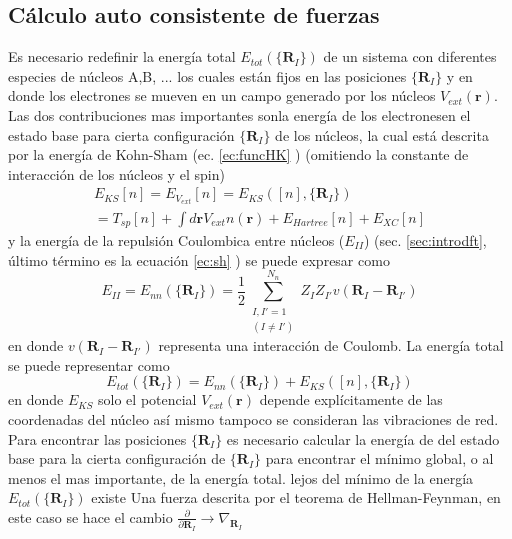 \documentclass[12pt,a4paper, oneside]{book}
\begin{document}
   \subsection{C\'alculo auto consistente de fuerzas} \label{subsec:SConsFuerza}
   Es necesario redefinir la energ\'ia total $E_{tot} (\{\pmb{R}_I\})$ de un sistema con diferentes especies de n\'ucleos A,B, ... los cuales est\'an fijos en las posiciones $\{\pmb{R}_I\} $ y en donde los electrones se mueven en un campo generado por los n\'ucleos $V_{ext} (\pmb{r})$. Las dos contribuciones mas importantes sonla energ\'ia de los electronesen el estado base para cierta configuraci\'on $\{\pmb{R}_I\}$ de los n\'ucleos, la cual est\'a descrita por la energ\'ia de Kohn-Sham (ec. \ref{ec:funcHK} )  (omitiendo la constante de interacci\'on de los n\'ucleos y el spin)
   \begin{multline}
   E_{KS} [n] = E_{V_{ext}} [n] = E_{KS} ([n],\{\pmb{R}_I\}) \\
   = T_{sp} [n] + \int d \pmb{r} V_{ext} n(\pmb{r}) + E_{Hartree} [n] + E_{XC} [n] \label{ec:KS_Fuerza}
   \end{multline}
   y la energ\'ia de la repulsi\'on Coulombica  entre n\'ucleos ($E_{I I}$) (sec. \ref{sec:introdft}, \'ultimo t\'ermino es la ecuaci\'on \ref{ec:sh} ) se puede expresar como
   \begin{equation}
   	E_{II} = E_{nn} (\{\pmb{R}_I\}) = \frac{1}{2} \sum_{\substack{I,I' = 1 \\ (I \not = I')}}^ {N_n} Z_I Z_{I'} v(\pmb{R}_I - \pmb{R}_{I'}) \label{ec:IntII}
   \end{equation}
   en donde $ v(\pmb{R}_I - \pmb{R}_{I'})$ representa una interacci\'on de Coulomb. La energ\'ia total se puede representar como
   \begin{equation}
   E_{tot} (\{\pmb{R}_I\}) = E_{nn} (\{\pmb{R}_I\}) + E_{KS} ([n], \{\pmb{R}_I\}) \label{ec:EnTot2} 
   \end{equation}
   en donde $E_{KS}$ solo el potencial $V_{ext} (\pmb{r})$ depende expl\'icitamente de las coordenadas del n\'ucleo as\'i mismo tampoco se consideran las vibraciones de red.
   \newline
   Para encontrar las posiciones $ \{\pmb{R}_I \}$ es necesario calcular la energ\'ia de del estado base para la cierta configuraci\'on de $ \{\pmb{R}_I \}$ para encontrar el m\'inimo global, o al menos el mas importante,  de la energ\'ia total. lejos del m\'inimo de la energ\'ia $E_{tot} (\{\pmb{R}_I\})$ existe Una fuerza descrita por el teorema de Hellman-Feynman, en este caso se hace el cambio $\frac{\partial}{\partial \pmb{R}_I}  \rightarrow \nabla_{\pmb{R}_I}$
\end{document}

